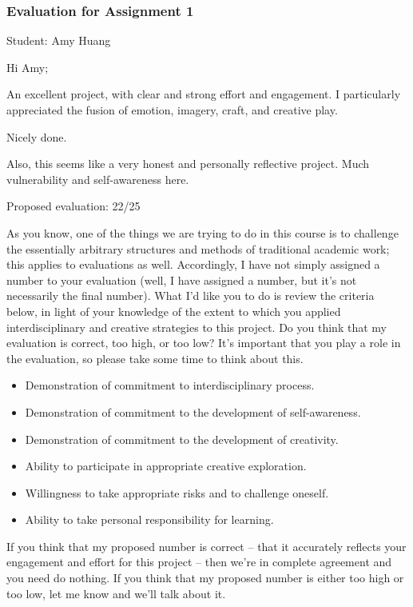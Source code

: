 \documentclass[letterpaper,10pt,DIV=9,headsepline]{scrreprt}
\begin{document}
\newpage

\subsubsection{Evaluation for Assignment 1}

Student: Amy Huang

\bigskip
Hi Amy;

An excellent project, with clear and strong effort and engagement. I
particularly appreciated the fusion of emotion, imagery, craft, and
creative play.

Nicely done.

Also, this seems like a very honest and personally reflective project.
Much vulnerability and self-awareness here.


\bigskip
Proposed evaluation: 22/25

\bigskip
As you know, one of the things we are trying to do in this course is
to challenge the essentially arbitrary structures and methods of
traditional academic work; this applies to evaluations as well.
Accordingly, I have not simply assigned a number to your evaluation
(well, I have assigned a number, but it's not necessarily the final
number). What I'd like you to do is review the criteria below, in
light of your knowledge of the extent to which you applied
interdisciplinary and creative strategies to this project. Do you
think that my evaluation is correct, too high, or too low? It's
important that you play a role in the evaluation, so please take some
time to think about this.

\begin{itemize}
\item Demonstration of commitment to interdisciplinary process.
\item Demonstration of commitment to the development of self-awareness.
\item Demonstration of commitment to the development of creativity.
\item Ability to participate in appropriate creative exploration.
\item Willingness to take appropriate risks and to challenge oneself.
\item Ability to take personal responsibility for learning.
\end{itemize}

If you think that my proposed number is correct -- that it accurately
reflects your engagement and effort for this project -- then we're in
complete agreement and you need do nothing. If you think that my
proposed number is either too high or too low, let me know and we'll
talk about it.
\end{document}
